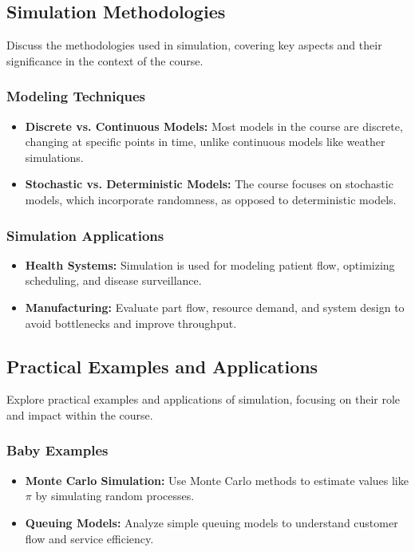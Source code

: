 \subsection{Simulation Methodologies}
Discuss the methodologies used in simulation, covering key aspects and their significance in the context of the course.

\subsubsection{Modeling Techniques}
\begin{itemize}
    \item \textbf{Discrete vs. Continuous Models:} Most models in the course are discrete, changing at specific points in time, unlike continuous models like weather simulations.
    \item \textbf{Stochastic vs. Deterministic Models:} The course focuses on stochastic models, which incorporate randomness, as opposed to deterministic models.
\end{itemize}

\subsubsection{Simulation Applications}
\begin{itemize}
    \item \textbf{Health Systems:} Simulation is used for modeling patient flow, optimizing scheduling, and disease surveillance.
    \item \textbf{Manufacturing:} Evaluate part flow, resource demand, and system design to avoid bottlenecks and improve throughput.
\end{itemize}

\subsection{Practical Examples and Applications}
Explore practical examples and applications of simulation, focusing on their role and impact within the course.

\subsubsection{Baby Examples}
\begin{itemize}
    \item \textbf{Monte Carlo Simulation:} Use Monte Carlo methods to estimate values like $\pi$ by simulating random processes.
    \item \textbf{Queuing Models:} Analyze simple queuing models to understand customer flow and service efficiency.
\end{itemize}

